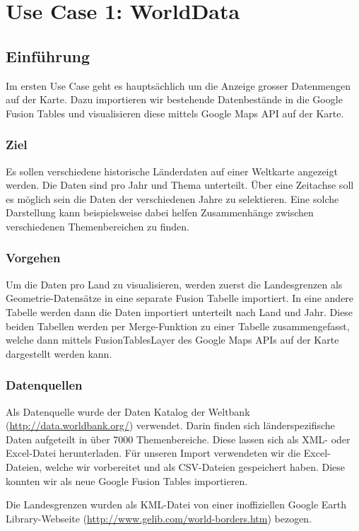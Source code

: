 \chapter{Use Case 1: WorldData}

\section{Einführung}
Im ersten Use Case geht es hauptsächlich um die Anzeige grosser Datenmengen auf der Karte. Dazu importieren wir bestehende Datenbestände in die Google Fusion Tables und visualisieren diese mittels Google Maps API auf der Karte.

\subsection{Ziel}
Es sollen verschiedene historische Länderdaten auf einer Weltkarte angezeigt werden. Die Daten sind pro Jahr und Thema unterteilt. Über eine Zeitachse soll es möglich sein die Daten der verschiedenen Jahre zu selektieren. Eine solche Darstellung kann beispielsweise dabei helfen Zusammenhänge zwischen verschiedenen Themenbereichen zu finden.

\subsection{Vorgehen}
Um die Daten pro Land zu visualisieren, werden zuerst die Landesgrenzen als Geometrie-Datensätze in eine separate Fusion Tabelle importiert. In eine andere Tabelle werden dann die Daten importiert unterteilt nach Land und Jahr. Diese beiden Tabellen werden per Merge-Funktion zu einer Tabelle zusammengefasst, welche dann mittels FusionTablesLayer des Google Maps APIs auf der Karte dargestellt werden kann.

\subsection{Datenquellen}
Als Datenquelle wurde der Daten Katalog der Weltbank (\url{http://data.worldbank.org/}) verwendet. Darin finden sich länderspezifische Daten aufgeteilt in über 7000 Themenbereiche. Diese lassen sich als XML- oder Excel-Datei herunterladen. Für unseren Import verwendeten wir die Excel-Dateien, welche wir vorbereitet und als CSV-Dateien gespeichert haben. Diese konnten wir als neue Google Fusion Tables importieren.

Die Landesgrenzen wurden als \gls{KML}-Datei von einer inoffiziellen Google Earth Library-Webseite (\url{http://www.gelib.com/world-borders.htm}) bezogen. 

